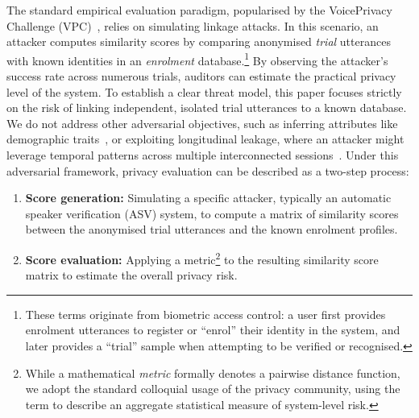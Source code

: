 The standard empirical evaluation paradigm, popularised by the VoicePrivacy Challenge (VPC)~\cite{tomashenko2020introducing}, relies on simulating linkage attacks. In this scenario, an attacker computes similarity scores by comparing anonymised \textit{trial} utterances with known identities in an \textit{enrolment} database.\footnote{These terms originate from biometric access control: a user first provides enrolment utterances to register or ``enrol'' their identity in the system, and later provides a ``trial'' sample when attempting to be verified or recognised.} By observing the attacker's success rate across numerous trials, auditors can estimate the practical privacy level of the system. To establish a clear threat model, this paper focuses strictly on the risk of linking independent, isolated trial utterances to a known database. We do not address other adversarial objectives, such as inferring attributes like demographic traits~\cite{meyer2023voicepat}, or exploiting longitudinal leakage, where an attacker might leverage temporal patterns across multiple interconnected sessions~\cite{vauquier2025legally}. Under this adversarial framework, privacy evaluation can be described as a two-step process:
\begin{enumerate}
    \item \textbf{Score generation:} Simulating a specific attacker, typically an automatic speaker verification (ASV) system, to compute a matrix of similarity scores between the anonymised trial utterances and the known enrolment profiles.
    \item \textbf{Score evaluation:} Applying a metric\footnote{While a mathematical \textit{metric} formally denotes a pairwise distance function, we adopt the standard colloquial usage of the privacy community, using the term to describe an aggregate statistical measure of system-level risk.} to the resulting similarity score matrix to estimate the overall privacy risk.
\end{enumerate}


